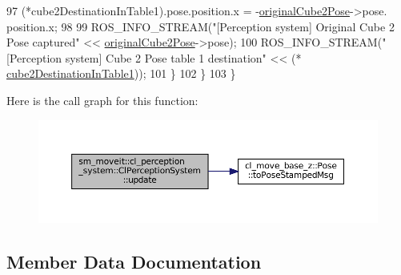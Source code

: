 \begin{DoxyCode}
97                 (*cube2DestinationInTable1).pose.position.x = -\hyperlink{classsm__moveit_1_1cl__perception__system_1_1ClPerceptionSystem_a7d8cdfe20da5b47871adf9d3dce11338}{originalCube2Pose}->pose.
      position.x;
98 
99                 ROS\_INFO\_STREAM(\textcolor{stringliteral}{"[Perception system] Original Cube 2 Pose captured"} << 
      \hyperlink{classsm__moveit_1_1cl__perception__system_1_1ClPerceptionSystem_a7d8cdfe20da5b47871adf9d3dce11338}{originalCube2Pose}->pose);
100                 ROS\_INFO\_STREAM(\textcolor{stringliteral}{"[Perception system] Cube 2 Pose table 1 destination"} << (*
      \hyperlink{classsm__moveit_1_1cl__perception__system_1_1ClPerceptionSystem_abb792620853ba381aa0736b884dabe92}{cube2DestinationInTable1}));
101             \}
102         \}
103     \}
\end{DoxyCode}
Here is the call graph for this function\+:
\nopagebreak
\begin{figure}[H]
\begin{center}
\leavevmode
\includegraphics[width=350pt]{classsm__moveit_1_1cl__perception__system_1_1ClPerceptionSystem_aaefca9001d3836655d38ee92621c013e_cgraph}
\end{center}
\end{figure}


\subsection{Member Data Documentation}
\mbox{\label{classsm__moveit_1_1cl__perception__system_1_1ClPerceptionSystem_ab84bbc2d5e5a7ef7839a0ade56942679}} 
